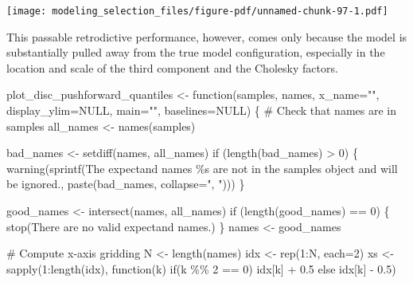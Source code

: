 \documentclass[
  letterpaper,
  DIV=11,
  numbers=noendperiod]{scrartcl}
\newenvironment{Shaded}{\begin{snugshade}}{\end{snugshade}}
\newcommand{\AttributeTok}[1]{\textcolor[rgb]{0.40,0.45,0.13}{#1}}
\newcommand{\CommentTok}[1]{\textcolor[rgb]{0.37,0.37,0.37}{#1}}
\newcommand{\ConstantTok}[1]{\textcolor[rgb]{0.56,0.35,0.01}{#1}}
\newcommand{\ControlFlowTok}[1]{\textcolor[rgb]{0.00,0.23,0.31}{#1}}
\newcommand{\DecValTok}[1]{\textcolor[rgb]{0.68,0.00,0.00}{#1}}
\newcommand{\FloatTok}[1]{\textcolor[rgb]{0.68,0.00,0.00}{#1}}
\newcommand{\FunctionTok}[1]{\textcolor[rgb]{0.28,0.35,0.67}{#1}}
\newcommand{\NormalTok}[1]{\textcolor[rgb]{0.00,0.23,0.31}{#1}}
\newcommand{\OtherTok}[1]{\textcolor[rgb]{0.00,0.23,0.31}{#1}}
\newcommand{\SpecialCharTok}[1]{\textcolor[rgb]{0.37,0.37,0.37}{#1}}
\newcommand{\StringTok}[1]{\textcolor[rgb]{0.13,0.47,0.30}{#1}}
\begin{document}
\texttt{[image: modeling\_selection\_files/figure-pdf/unnamed-chunk-97-1.pdf]}

This passable retrodictive performance, however, comes only because the
model is substantially pulled away from the true model configuration,
especially in the location and scale of the third component and the
Cholesky factors.

\begin{Shaded}
\begin{Highlighting}[]
\NormalTok{plot\_disc\_pushforward\_quantiles }\OtherTok{\textless{}{-}} \ControlFlowTok{function}\NormalTok{(samples, names,}
                                            \AttributeTok{x\_name=}\StringTok{""}\NormalTok{, }\AttributeTok{display\_ylim=}\ConstantTok{NULL}\NormalTok{,}
                                            \AttributeTok{main=}\StringTok{""}\NormalTok{, }\AttributeTok{baselines=}\ConstantTok{NULL}\NormalTok{) \{}
  \CommentTok{\# Check that names are in samples}
\NormalTok{  all\_names }\OtherTok{\textless{}{-}} \FunctionTok{names}\NormalTok{(samples)}

\NormalTok{  bad\_names }\OtherTok{\textless{}{-}} \FunctionTok{setdiff}\NormalTok{(names, all\_names)}
  \ControlFlowTok{if}\NormalTok{ (}\FunctionTok{length}\NormalTok{(bad\_names) }\SpecialCharTok{\textgreater{}} \DecValTok{0}\NormalTok{) \{}
    \FunctionTok{warning}\NormalTok{(}\FunctionTok{sprintf}\NormalTok{(}\StringTok{\textquotesingle{}The expectand names \%s are not in the \textasciigrave{}samples\textasciigrave{} object and will be ignored.\textquotesingle{}}\NormalTok{,}
                    \FunctionTok{paste}\NormalTok{(bad\_names, }\AttributeTok{collapse=}\StringTok{", "}\NormalTok{)))}
\NormalTok{  \}}

\NormalTok{  good\_names }\OtherTok{\textless{}{-}} \FunctionTok{intersect}\NormalTok{(names, all\_names)}
  \ControlFlowTok{if}\NormalTok{ (}\FunctionTok{length}\NormalTok{(good\_names) }\SpecialCharTok{==} \DecValTok{0}\NormalTok{) \{}
    \FunctionTok{stop}\NormalTok{(}\StringTok{\textquotesingle{}There are no valid expectand names.\textquotesingle{}}\NormalTok{)}
\NormalTok{  \}}
\NormalTok{  names }\OtherTok{\textless{}{-}}\NormalTok{ good\_names}

  \CommentTok{\# Compute x{-}axis gridding}
\NormalTok{  N }\OtherTok{\textless{}{-}} \FunctionTok{length}\NormalTok{(names)}
\NormalTok{  idx }\OtherTok{\textless{}{-}} \FunctionTok{rep}\NormalTok{(}\DecValTok{1}\SpecialCharTok{:}\NormalTok{N, }\AttributeTok{each=}\DecValTok{2}\NormalTok{)}
\NormalTok{  xs }\OtherTok{\textless{}{-}} \FunctionTok{sapply}\NormalTok{(}\DecValTok{1}\SpecialCharTok{:}\FunctionTok{length}\NormalTok{(idx), }\ControlFlowTok{function}\NormalTok{(k) }\ControlFlowTok{if}\NormalTok{(k }\SpecialCharTok{\%\%} \DecValTok{2} \SpecialCharTok{==} \DecValTok{0}\NormalTok{) idx[k] }\SpecialCharTok{+} \FloatTok{0.5}
               \ControlFlowTok{else}\NormalTok{ idx[k] }\SpecialCharTok{{-}} \FloatTok{0.5}\NormalTok{)}


\end{Highlighting}
\end{Shaded}
\end{document}
